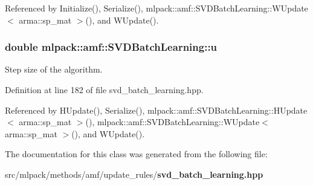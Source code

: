 Referenced by Initialize(), Serialize(), mlpack\+::amf\+::\+S\+V\+D\+Batch\+Learning\+::\+W\+Update$<$ arma\+::sp\+\_\+mat $>$(), and W\+Update().

\subsubsection[{u}]{\setlength{\rightskip}{0pt plus 5cm}double mlpack\+::amf\+::\+S\+V\+D\+Batch\+Learning\+::u\hspace{0.3cm}{\ttfamily [private]}}\label{classmlpack_1_1amf_1_1SVDBatchLearning_acea55e198332c16129d79bb00cc97737}


Step size of the algorithm. 



Definition at line 182 of file svd\+\_\+batch\+\_\+learning.\+hpp.



Referenced by H\+Update(), Serialize(), mlpack\+::amf\+::\+S\+V\+D\+Batch\+Learning\+::\+H\+Update$<$ arma\+::sp\+\_\+mat $>$(), mlpack\+::amf\+::\+S\+V\+D\+Batch\+Learning\+::\+W\+Update$<$ arma\+::sp\+\_\+mat $>$(), and W\+Update().



The documentation for this class was generated from the following file\+:\begin{DoxyCompactItemize}
\item 
src/mlpack/methods/amf/update\+\_\+rules/{\bf svd\+\_\+batch\+\_\+learning.\+hpp}\end{DoxyCompactItemize}
